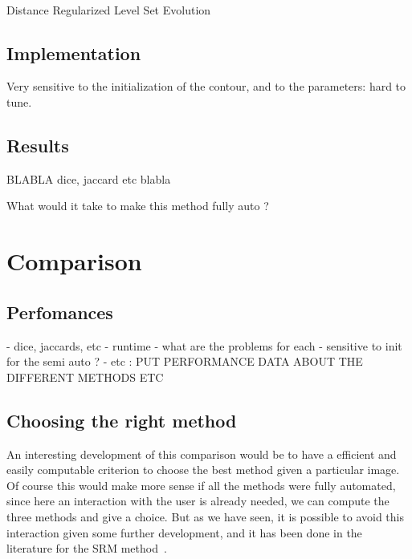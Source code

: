 \documentclass[a4paper,10pt]{article}
\begin{document}
\paragraph{}  Distance Regularized Level Set Evolution \cite{li2010distance} 
\subsection{Implementation}
Very sensitive to the initialization of the contour, and to the parameters: hard to tune.

\subsection{Results}

BLABLA dice, jaccard etc
blabla

What would it take to make this method fully auto ?

\section{Comparison}

\subsection{Perfomances}
- dice, jaccards, etc
- runtime
- what are the problems for each
- sensitive to init for the semi auto ?
- etc : PUT PERFORMANCE DATA ABOUT THE DIFFERENT METHODS
ETC

\subsection{Choosing the right method}
An interesting development of this comparison would be to have a efficient and easily computable criterion to choose the best method given a particular image. Of course this would make more sense if all the methods were fully automated, since here an interaction with the user is already needed, we can compute the three methods and give a choice. But as we have seen, it is possible to avoid this interaction given some further development, and it has been done in the literature for the SRM method~\cite{celebi_border_2008}. 
\end{document}
